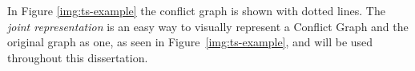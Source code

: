 \documentclass[msc,english,table,xcdraw]{ppgccufmg}
\begin{document}
In Figure \ref{img:ts-example} the conflict graph is shown with dotted lines. The \textit{joint representation} is an easy way to visually represent a Conflict 
Graph and the original graph as one, as seen in Figure~\ref{img:ts-example}, 
and will be used throughout this dissertation.






\end{document}
